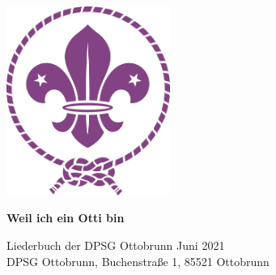 \documentclass[../main.tex]{subfiles}
\begin{document}
\begin{titlepage}
   \begin{center}
       \vspace*{5cm}
       \includegraphics[width=0.4\textwidth]{images/wosm-lily}
       
       \vspace{1cm}
       
       \textbf{\Huge Weil ich ein Otti bin}
       
       \vspace{0.5cm}
       
       {\large Liederbuch der DPSG Ottobrunn}
       \vfill
       Juni 2021\\
       DPSG Ottobrunn, Buchenstraße 1, 85521 Ottobrunn    
   \end{center}
\end{titlepage}
\end{document}
